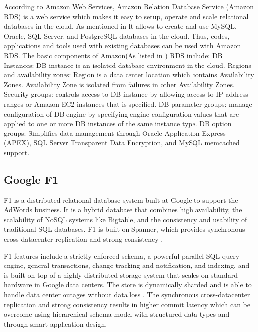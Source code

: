      According to Amazon Web Services, Amazon Relation Database
     Service (Amazon RDS) is a web service which makes it easy to
     setup, operate and scale relational databases in the cloud. As
     mentioned in \cite{www-AmazonRDS} It allows to create and use
     MySQL, Oracle, SQL Server, and PostgreSQL databases in the
     cloud. Thus, codes, applications and tools used with existing
     databases can be used with Amazon RDS. The basic components of
     Amazon(As listed in \cite{www-AmazonRDSComponents}) RDS include:
     DB Instances: DB instance is an isolated database environment in
     the cloud. Regions and availability zones: Region is a data
     center location which contains Availability Zones. Availability
     Zone is isolated from failures in other Availability
     Zones. Security groups: controls access to DB instance by
     allowing access to IP address ranges or Amazon EC2 instances that
     is specified. DB parameter groups: manage configuration of DB
     engine by specifying engine configuration values that are applied
     to one or more DB instances of the same instance type. DB option
     groups: Simplifies data management through Oracle Application
     Express (APEX), SQL Server Transparent Data Encryption, and MySQL
     memcached support.

     
\subsection{ Google F1}

     F1 is a distributed relational database system built at Google to
     support the AdWords business. It is a hybrid database that
     combines high availability, the scalability of NoSQL systems like
     Bigtable, and the consistency and usability of traditional SQL
     databases. F1 is built on Spanner, which provides synchronous
     cross-datacenter replication and strong consistency
     \cite{paper-F1}.
     
     F1 features include a strictly enforced schema, a powerful
     parallel SQL query engine, general transactions, change tracking
     and notification, and indexing, and is built on top of a
     highly-distributed storage system that scales on standard
     hardware in Google data centers. The store is dynamically sharded
     and is able to handle data center outages without data loss
     \cite{paper-RDBMS} . The synchronous cross-datacenter
     replication and strong consistency results in higher commit
     latency which can be overcome using hierarchical schema model
     with structured data types and through smart application design.
     

